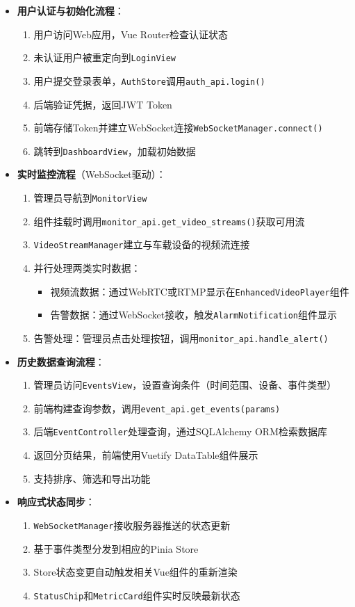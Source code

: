 \documentclass[a4paper,12pt]{article}
\begin{document}
\begin{itemize}
  \item \textbf{用户认证与初始化流程}：
    \begin{enumerate}
      \item 用户访问Web应用，Vue Router检查认证状态
      \item 未认证用户被重定向到\texttt{LoginView}
      \item 用户提交登录表单，\texttt{AuthStore}调用\texttt{auth\_api.login()}
      \item 后端验证凭据，返回JWT Token
      \item 前端存储Token并建立WebSocket连接\texttt{WebSocketManager.connect()}
      \item 跳转到\texttt{DashboardView}，加载初始数据
    \end{enumerate}
  \item \textbf{实时监控流程}（WebSocket驱动）：
    \begin{enumerate}
      \item 管理员导航到\texttt{MonitorView}
      \item 组件挂载时调用\texttt{monitor\_api.get\_video\_streams()}获取可用流
      \item \texttt{VideoStreamManager}建立与车载设备的视频流连接
      \item 并行处理两类实时数据：
        \begin{itemize}
          \item 视频流数据：通过WebRTC或RTMP显示在\texttt{EnhancedVideoPlayer}组件
          \item 告警数据：通过WebSocket接收，触发\texttt{AlarmNotification}组件显示
        \end{itemize}
      \item 告警处理：管理员点击处理按钮，调用\texttt{monitor\_api.handle\_alert()}
    \end{enumerate}
  \item \textbf{历史数据查询流程}：
    \begin{enumerate}
      \item 管理员访问\texttt{EventsView}，设置查询条件（时间范围、设备、事件类型）
      \item 前端构建查询参数，调用\texttt{event\_api.get\_events(params)}
      \item 后端\texttt{EventController}处理查询，通过SQLAlchemy ORM检索数据库
      \item 返回分页结果，前端使用Vuetify DataTable组件展示
      \item 支持排序、筛选和导出功能
    \end{enumerate}
  \item \textbf{响应式状态同步}：
    \begin{enumerate}
      \item \texttt{WebSocketManager}接收服务器推送的状态更新
      \item 基于事件类型分发到相应的Pinia Store
      \item Store状态变更自动触发相关Vue组件的重新渲染
      \item \texttt{StatusChip}和\texttt{MetricCard}组件实时反映最新状态
    \end{enumerate}
\end{itemize}
\end{document}
